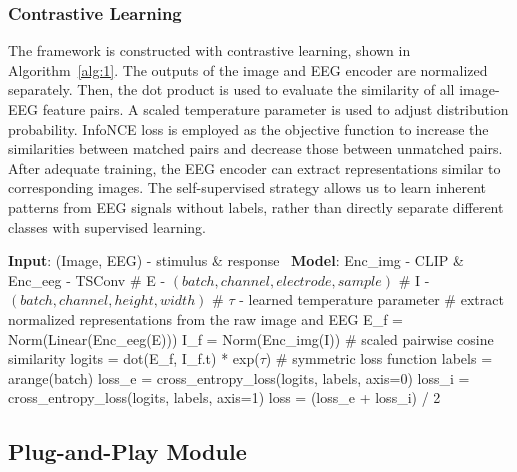 \subsubsection{Contrastive Learning}
The framework is constructed with contrastive learning, shown in Algorithm~\ref{alg:1}.
The outputs of the image and EEG encoder are normalized separately. 
Then, the dot product is used to evaluate the similarity of all image-EEG feature pairs.
A scaled temperature parameter is used to adjust distribution probability.
InfoNCE loss \citep{radford2021learning, oord2019representation} is employed as the objective function to increase the similarities between matched pairs and decrease those between unmatched pairs.
After adequate training, the EEG encoder can extract representations similar to corresponding images.
The self-supervised strategy allows us to learn inherent patterns from EEG signals without labels, rather than directly separate different classes with supervised learning. 

\begin{algorithm}[h]
\caption{Natural Image Contrast EEG framework} 
\label{alg:1}
\small
{\selectfont
\begin{algorithmic}[1]
    \State \textbf{Input}: (Image, EEG) - stimulus \& response \
    \State \textbf{Model}: Enc\_img - CLIP \&  Enc\_eeg - TSConv 
    \Statex 
    \State \# E - \((batch, channel, electrode, sample)\) 
    \State \# I - \((batch, channel, height, width)\) \Comment{batch of input images}
    \State \# \(\tau\) - learned temperature parameter
    \Statex
    \State \# extract normalized representations from the raw image and EEG
    \State E\_f = Norm(Linear(Enc\_eeg(E))) 
    \State I\_f = Norm(Enc\_img(I))  
    \Statex
    \State \# scaled pairwise cosine similarity 
    \State logits = dot(E\_f, I\_f.t) * exp(\(\tau\)) 
    \Statex
    \State \# symmetric loss function
    \State labels = arange(batch)
    \State loss\_e = cross\_entropy\_loss(logits, labels, axis=0)
    \State loss\_i = cross\_entropy\_loss(logits, labels, axis=1)
    \State loss = (loss\_e + loss\_i) / 2
\end{algorithmic}}
\end{algorithm}

\subsection{Plug-and-Play Module}
